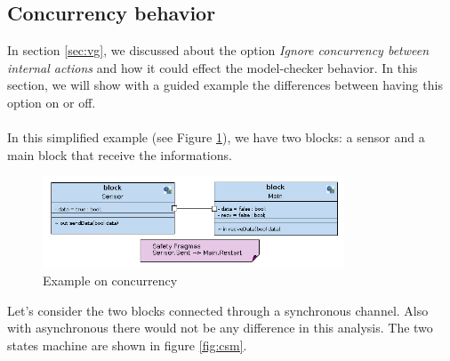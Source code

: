 \documentclass[12pt]{article}
\begin{document}
\subsection{Concurrency behavior} \label{sec:cb}
In section \ref{sec:vg}, we discussed about the option \textit{Ignore concurrency between internal actions} and how it could effect the model-checker behavior. In this section, we will show with a guided example the differences between having this option on or off.
\\\\
In this simplified example (see Figure \ref{fig:cb}), we have two blocks: a sensor and a main block that receive the informations.
\begin{figure}[h!]
\centering
\includegraphics[width=0.8\textwidth]{images/conc_blocks.png}
\caption{Example on concurrency}
\label{fig:cb}
\end{figure}
Let's consider the two blocks connected through a synchronous channel. Also with asynchronous there would not be any difference in this analysis. The two states machine are shown in figure \ref{fig:csm}.
\end{document}
